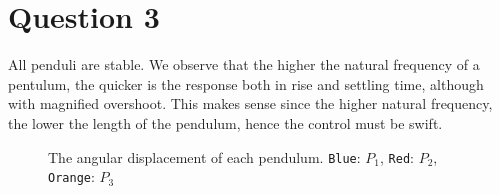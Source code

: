 \section{Question 3}

All penduli are stable. We observe that the higher the natural frequency of a
pentulum, the quicker is the response both in rise and settling time, although
with magnified overshoot. This makes sense since the higher natural frequency,
the lower the length of the pendulum, hence the control must be swift.

\begin{figure}[H]\centering
  \scalebox{1}{}
  \caption{The angular displacement of each pendulum. \texttt{Blue}: $P_1$,
    \texttt{Red}: $P_2$, \texttt{Orange}: $P_3$}
\end{figure}
